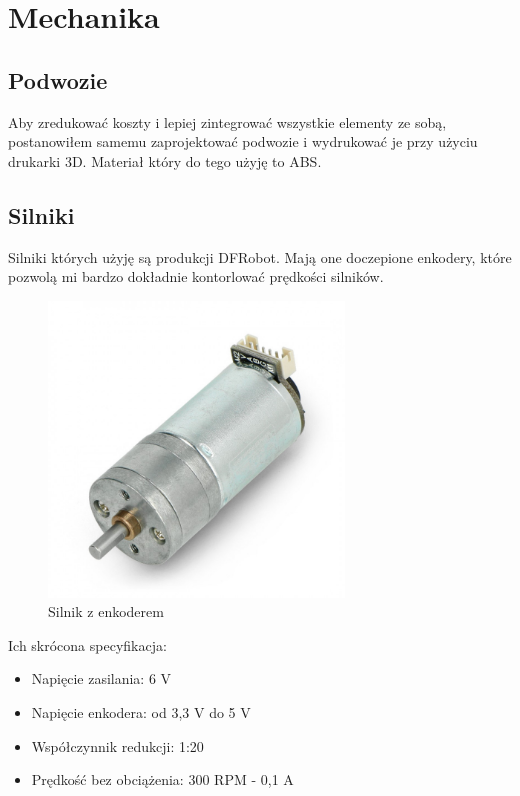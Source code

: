 \documentclass[10pt, a4paper]{article}
\begin{document}
\section{Mechanika}
\subsection{Podwozie}
Aby zredukować koszty i lepiej zintegrować wszystkie elementy ze sobą,
postanowiłem samemu zaprojektować podwozie i wydrukować je przy użyciu drukarki 3D.
Materiał który do tego użyję to ABS.

\subsection{Silniki}
Silniki których użyję są produkcji DFRobot. Mają one doczepione enkodery, 
które pozwolą mi bardzo dokładnie kontorlować prędkości silników.
\begin{figure}[H]
	\centering
	\includegraphics[width=0.7\textwidth]{figures/silnik.png}
	\caption{Silnik z enkoderem}
	\label{fig:silnk}
\end{figure}

Ich skrócona specyfikacja:
\begin{itemize}
	\item Napięcie zasilania: 6 V
	\item Napięcie enkodera: od 3,3 V do 5 V
	\item Współczynnik redukcji: 1:20
	\item Prędkość bez obciążenia: 300 RPM - 0,1 A
\end{itemize}
\end{document}
